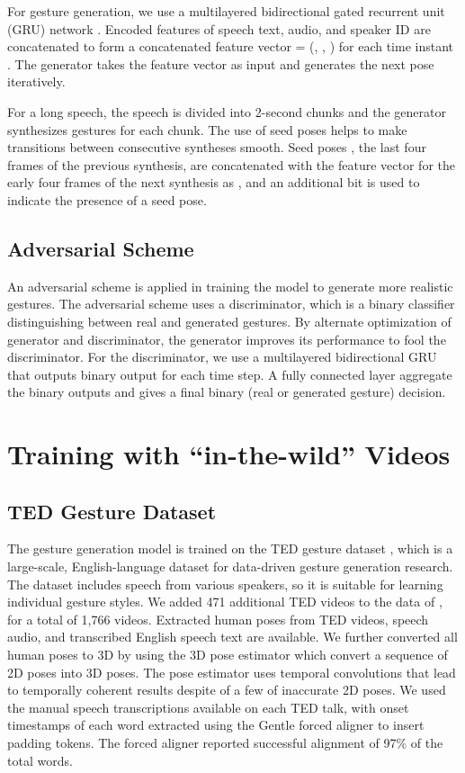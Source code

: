 \documentclass[acmtog]{acmart}
\begin{document}
For gesture generation, we use a multilayered bidirectional gated recurrent unit (GRU) network \cite{cho2014learning}. Encoded features of speech text, audio, and speaker ID are concatenated to form a concatenated feature vector  = (, , ) for each time instant . The generator takes the feature vector  as input and generates the next pose  iteratively. 

For a long speech, the speech is divided into 2-second chunks and the generator synthesizes gestures for each chunk. The use of seed poses helps to make transitions between consecutive syntheses smooth. Seed poses , the last four frames of the previous synthesis, are concatenated with the feature vector for the early four frames of the next synthesis as , and an additional bit is used to indicate the presence of a seed pose.

\subsection{Adversarial Scheme}
An adversarial scheme \cite{goodfellow2014generative} is applied in training the model to generate more realistic gestures. The adversarial scheme uses a discriminator, which is a binary classifier distinguishing between real and generated gestures. By alternate optimization of generator and discriminator, the generator improves its performance to fool the discriminator. For the discriminator, we use a multilayered bidirectional GRU that outputs binary output for each time step. A fully connected layer aggregate the  binary outputs and gives a final binary (real or generated gesture) decision.
 \section{Training with ``in-the-wild'' Videos} \label{sec:training}

\subsection{TED Gesture Dataset}
The gesture generation model is trained on the TED gesture dataset \cite{yoon2019robots}, which is a large-scale, English-language dataset for data-driven gesture generation research. The dataset includes speech from various speakers, so it is suitable for learning individual gesture styles. We added 471 additional TED videos to the data of \cite{yoon2019robots}, for a total of 1,766 videos. Extracted human poses from TED videos, speech audio, and transcribed English speech text are available. We further converted all human poses to 3D by using the 3D pose estimator \cite{pavllo20193d} which convert a sequence of 2D poses into 3D poses. The pose estimator uses temporal convolutions that lead to temporally coherent results despite of a few of inaccurate 2D poses. We used the manual speech transcriptions available on each TED talk, with onset timestamps of each word extracted using the Gentle forced aligner \cite{ochshorn2016gentle} to insert padding tokens. The forced aligner reported successful alignment of 97\% of the total words.
\end{document}
